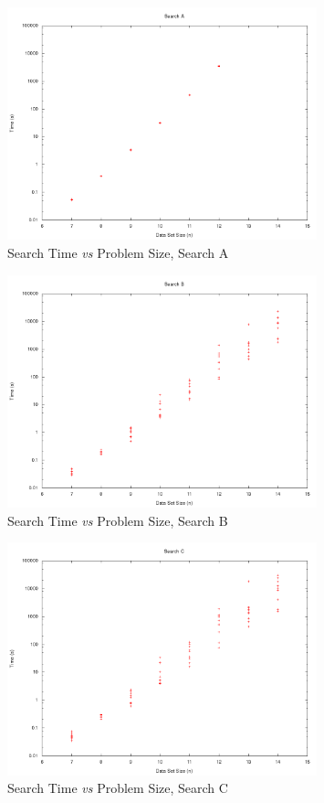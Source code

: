 \documentclass{article}
\begin{document}

\begin{figure}[p]
	\centering
	\includegraphics[width=0.8\textwidth]{../images/times_search_a.png}
	\caption{Search Time {\it vs} Problem Size, Search A}
	\label{fig:times_search_a}
\end{figure}

\begin{figure}[p]
	\centering
	\includegraphics[width=0.8\textwidth]{../images/times_search_b.png}
	\caption{Search Time {\it vs} Problem Size, Search B}
	\label{fig:times_search_b}
\end{figure}

\begin{figure}[p]
	\centering
	\includegraphics[width=0.8\textwidth]{../images/times_search_c.png}
	\caption{Search Time {\it vs} Problem Size, Search C}
	\label{fig:times_search_c}
\end{figure}
\end{document}
